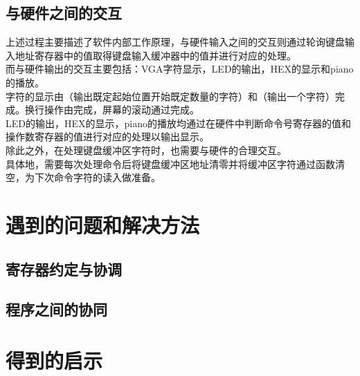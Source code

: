 \subsection{与硬件之间的交互}
\songti
\hspace*{5mm}上述过程主要描述了软件内部工作原理，与硬件输入之间的交互则通过轮询键盘输入地址寄存器中的值取得键盘输入缓冲器中的值并进行对应的处理。
\\\hspace*{5mm}而与硬件输出的交互主要包括：VGA字符显示，LED的输出，HEX的显示和piano的播放。
\kaishu
\\\hspace*{5mm}字符的显示由（输出既定起始位置开始既定数量的字符）和（输出一个字符）完成。换行操作由完成，屏幕的滚动通过完成。
\\\hspace*{5mm}LED的输出，HEX的显示，piano的播放均通过在硬件中判断命令号寄存器的值和操作数寄存器的值进行对应的处理以输出显示。
\songti
\\\hspace*{5mm}除此之外，在处理键盘缓冲区字符时，也需要与硬件的合理交互。
\kaishu
\\\hspace*{5mm}具体地，需要每次处理命令后将键盘缓冲区地址清零并将缓冲区字符通过函数清空，为下次命令字符的读入做准备。
\section{遇到的问题和解决方法}
\subsection{寄存器约定与协调}
\subsection{程序之间的协同}
\section{得到的启示}
